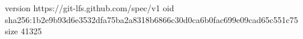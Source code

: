 version https://git-lfs.github.com/spec/v1
oid sha256:1b2e9b93d6e3532dfa75ba2a8318b6866c30d0ca6b0fac699e09cad65c551c75
size 41325
